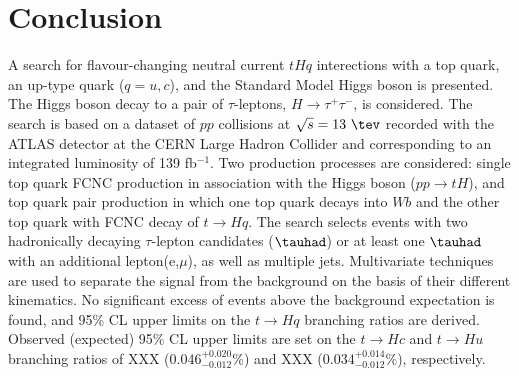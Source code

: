 \section{Conclusion}
\label{sec:conclusion}

A search for flavour-changing neutral current $tHq$ interections with a top quark,	an up-type quark ($q=u, c$), and the
Standard Model Higgs boson is presented. The Higgs boson decay to a pair of $\tau$-leptons, $H\rightarrow \tau^+\tau^-$, is considered.
The search is based on a dataset of $pp$ collisions at $\sqrt{s}=13~\tev$ recorded with the ATLAS detector at the
CERN Large Hadron Collider and corresponding to an integrated luminosity of 139 fb$^{-1}$.
Two production processes are considered:  single top quark FCNC production in association with the Higgs boson ($pp\rightarrow tH$), and top quark pair production in
which one top quark decays into $Wb$ and the other top quark with FCNC decay of $t\rightarrow Hq$.
The search selects events with two hadronically decaying $\tau$-lepton candidates ($\tauhad$) or at least one $\tauhad$ with an additional lepton(e,$\mu$),
as well as multiple jets.
Multivariate techniques are used to separate the signal from the background on the basis of their different kinematics.
No significant excess of events above the background expectation is found, and 95\% CL upper limits on the $t\to Hq$ branching ratios are derived.
Observed (expected) 95\% CL upper limits are set on the $t\to Hc$ and $t\to Hu$ branching ratios of XXX ($0.046^{+0.020}_{-0.012}\%$)
and XXX ($0.034^{+0.014}_{-0.012}\%$), respectively.
